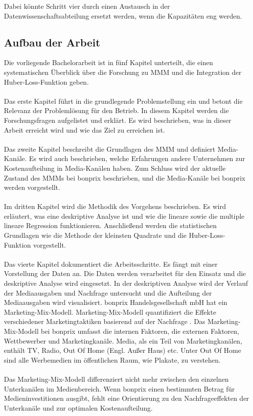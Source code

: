 Dabei könnte Schritt vier durch einen Austausch in der Datenwissenschaftsabteilung ersetzt werden, wenn die Kapazitäten eng werden.   
\subsection{Aufbau der Arbeit}
Die vorliegende Bachelorarbeit ist in fünf Kapitel unterteilt, die einen systematischen Überblick über die Forschung zu \ac{MMM} und die Integration der Huber-Loss-Funktion geben.\\\\
Das erste Kapitel  führt in die grundlegende Problemstellung ein und betont die Relevanz der Problemlösung für den Betrieb. In diesem Kapitel werden die Forschungsfragen aufgelistet und erklärt. Es wird beschrieben, was in dieser Arbeit erreicht wird und wie das Ziel zu erreichen ist. \\\\
Das zweite Kapitel  beschreibt die Grundlagen des \ac{MMM} und definiert Media-Kanäle. Es wird auch beschrieben, welche Erfahrungen andere Unternehmen zur Kostenaufteilung in Media-Kanälen haben. Zum Schluss wird der aktuelle Zustand des \ac{MMM}s bei bonprix beschrieben, und die Media-Kanäle bei bonprix werden vorgestellt. \\\\ 
Im dritten Kapitel  wird die Methodik des Vorgehens beschrieben. Es wird erläutert, was eine deskriptive Analyse ist und wie die lineare sowie die multiple lineare Regression funktionieren. Anschließend werden die statistischen Grundlagen wie die Methode der kleinsten Quadrate und die Huber-Loss-Funktion vorgestellt.\\\\
Das vierte Kapitel  dokumentiert die Arbeitsschritte. Es fängt mit einer Vorstellung der Daten an. Die Daten werden verarbeitet für den Einsatz und die deskriptive Analyse wird eingesetzt. In der deskriptiven Analyse wird der Verlauf der Mediaausgaben und Nachfrage untersucht und die Aufteilung der Mediaausgaben wird visualisiert.  
\iffalse
bonprix Handelsgesellschaft mbH hat ein Marketing-Mix-Modell. Marketing-Mix-Modell quantifiziert die Effekte verschiedener Marketingtaktiken basierend auf der Nachfrage \cite{MMMdef}. Das Marketing-Mix-Modell bei bonprix umfasst die internen Faktoren, die externen Faktoren, Wettbewerber und Marketingkanäle. Media, als ein Teil von Marketingkanälen, enthält TV, Radio, Out Of Home (Engl. Außer Haus) etc. Unter Out Of Home sind alle Werbemedien im öffentlichen Raum, wie Plakate, zu verstehen. \\\\
Das Marketing-Mix-Modell differenziert nicht mehr zwischen den einzelnen Unterkanälen im Medienbereich. Wenn bonprix einen bestimmten Betrag für Medieninvestitionen ausgibt, fehlt eine Orientierung zu den Nachfrageeffekten der Unterkanäle und zur optimalen Kostenaufteilung.

